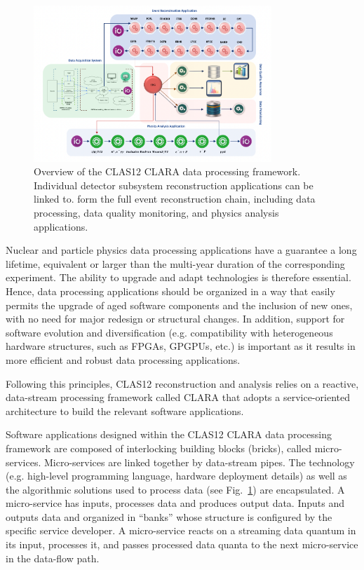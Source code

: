 \begin{figure}
\centering
\includegraphics[width=0.8\textwidth]{pics/clara-overview.pdf}
\caption{Overview of the CLAS12 CLARA data processing framework.  Individual detector subsystem reconstruction applications can be linked to. form the full event reconstruction chain, including  data processing, data quality monitoring, and physics analysis applications.}
\label{fig:clara-overview}
\end{figure}
Nuclear and particle physics data processing applications have a guarantee a long lifetime, equivalent or larger than the multi-year duration of the corresponding experiment. The ability to upgrade and adapt technologies is therefore essential. Hence, data processing applications should be organized in a way that easily permits the upgrade of aged software components and the inclusion of new ones, with  no need for major redesign or structural changes. In addition, support for software evolution and diversification (e.g. compatibility with heterogeneous hardware structures, such as FPGAs, GPGPUs, etc.) is important as it results in more efficient and robust data processing applications.


Following this principles, CLAS12 reconstruction and analysis relies on a reactive, data-stream processing framework called CLARA
\cite{clara-2011,clara-service,framework,clara-2016} that adopts a service-oriented architecture to build the relevant
software applications. 

Software applications designed within the CLAS12 CLARA data processing framework are composed of interlocking building blocks
(bricks), called micro-services. Micro-services are linked together by data-stream pipes.  The technology
(e.g. high-level programming language, hardware deployment details) as well as the algorithmic solutions used to process
data (see Fig.~\ref{fig:clara-overview}) are encapsulated. A micro-service has inputs, processes data and produces output data. Inputs and outputs data and organized in ``banks'' whose structure is configured by the specific service developer.
A micro-service reacts on a streaming data quantum in its input, processes it, and passes processed data quanta to the next micro-service in the data-flow path. 

